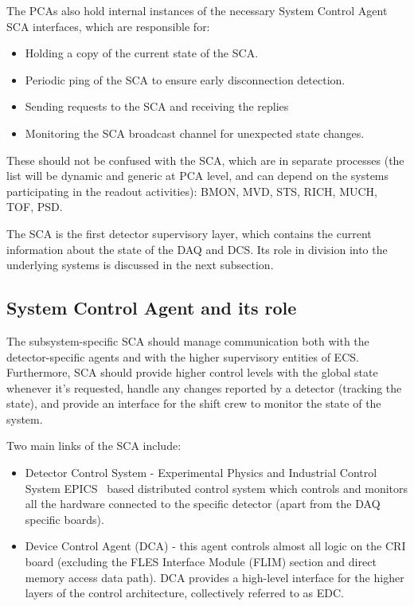 The \glspl{PCA} also hold internal instances of the necessary System Control Agent \gls{SCA} interfaces, which are responsible for:
\begin{itemize}
 \item Holding a copy of the current state of the \gls{SCA}.
 \item Periodic ping of the \gls{SCA} to ensure early disconnection detection.
 \item Sending requests to the \gls{SCA} and receiving the replies
 \item Monitoring the \gls{SCA} broadcast channel for unexpected state changes.
\end{itemize}

These should not be confused with the \gls{SCA}, which are in separate processes (the list will be dynamic and generic at \gls{PCA} level, and can depend on the systems participating in the readout activities): \gls{BMON}, \gls{MVD}, \gls{STS}, \gls{RICH}, \gls{MUCH}, \gls{TOF}, \gls{PSD}. 

The SCA is the first detector supervisory layer, which contains the current information about the state of the \gls{DAQ} and \gls{DCS}. Its role in division into the underlying systems is discussed in the next subsection.

\subsection{System Control Agent and its role}
The subsystem-specific \gls{SCA} should manage communication both with the detector-specific agents and with the higher supervisory entities of \gls{ECS}. Furthermore, \gls{SCA} should provide higher control levels with the global state whenever it's requested, handle any changes reported by a detector (tracking the state), and provide an interface for the shift crew to monitor the state of the system. 

Two main links of the \gls{SCA} include:
\begin{itemize}
    \item Detector Control System - Experimental Physics and Industrial Control System \gls{EPICS}~\cite{EPICS} based distributed control system which controls and monitors all the hardware connected to the specific detector (apart from the \gls{DAQ} specific boards).
    \item Device Control Agent (\gls{DCA}) - this agent controls almost all logic on the \gls{CRI} board (excluding the FLES Interface Module (\gls{FLIM}) section and direct memory access data path). \gls{DCA} provides a high-level interface for the higher layers of the control architecture, collectively referred to as \gls{EDC}. 
\end{itemize}










